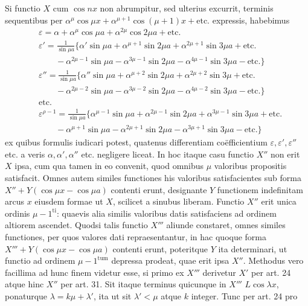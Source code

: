 Si functio $X$ cum $\cos nx$ non abrumpitur, sed ulterius excurrit, terminis
sequentibus per $\alpha^\mu\cos\mu x+\alpha^{\mu+1}\cos(\mu+1)x+\text{etc.}$ expressis, habebimus
\[
\begin{aligned}
&\varepsilon=\alpha+\alpha^\mu\cos\mu a+\alpha^{2\mu}\cos2\mu a+\text{etc.}\\[5pt]
&\varepsilon'=\frac{1}{\sin\mu a}\{\alpha'\sin\mu a+\alpha^{\mu+1}\sin2\mu a+\alpha^{2\mu+1}\sin3\mu a+\text{etc.}\\[5pt]
&\qquad-\alpha^{2\mu-1}\sin\mu a-\alpha^{3\mu-1}\sin2\mu a-\alpha^{4\mu-1}\sin3\mu a-\text{etc.}\}\\[5pt]
&\varepsilon''=\frac{1}{\sin\mu a}\{\alpha''\sin\mu a+\alpha^{\mu+2}\sin2\mu a+\alpha^{2\mu+2}\sin3\mu+\text{etc.}\\[5pt]
&\qquad-\alpha^{2\mu-2}\sin\mu a-\alpha^{3\mu-2}\sin2\mu a-\alpha^{4\mu-2}\sin3\mu a-\text{etc.}\}\\[5pt]
&\text{etc.}\\[5pt]
&\varepsilon^{\rho-1}=\frac{1}{\sin\mu a}\{\alpha^{\mu-1}\sin\mu a+\alpha^{2\mu-1}\sin2\mu a+\alpha^{3\mu-1}\sin3\mu a+\text{etc.}\\[5pt]
&\qquad-\alpha^{\mu+1}\sin\mu a-\alpha^{2\mu+1}\sin2\mu a-\alpha^{3\mu+1}\sin3\mu a-\text{etc.}\}
\end{aligned}
\]
ex quibus formulis iudicari potest, quatenus differentiam coëfficientium $\varepsilon,\varepsilon',\varepsilon''$ etc.
a veris $\alpha,\alpha',\alpha''$ etc. negligere liceat. In hoc itaque casu functio $X''$ non erit
$X$ ipsa, cum qua tamen in eo convenit, quod omnibus $\mu$ valoribus propositis satisfacit.
Omnes autem similes functiones his valoribus satisfacientes sub forma
$X''+Y(\cos\mu x-\cos\mu a)$ contenti erunt, designante $Y$ functionem indefinitam
arcus $x$ eiusdem formae ut $X$, scilicet a sinubus liberam. Functio $X''$ erit
unica ordinis $\mu-1^{\mathrm{ti}}$: quaevis alia similis valoribus datis satisfaciens ad ordinem
altiorem ascendet. Quodsi talis functio $X'''$ aliunde constaret, omnes
similes functiones, per quos valores dati repraesentantur, in hac quoque forma
$X'''+Y(\cos\mu x-\cos\mu a)$ contenti erunt, poteritque $Y$ ita determinari, ut functio
ad ordinem $\mu-1^{\mathrm{tum}}$ depressa prodeat, quae erit ipsa $X''$. Methodus vero facillima
ad hunc finem videtur esse, si primo ex $X'''$ derivetur $X'$ per art. 24 atque
hinc $X''$ per art. 31. Sit itaque terminus quicunque in $X'''$ $L\cos\lambda x$, ponaturque
$\lambda=k\mu+\lambda'$, ita ut sit $\lambda'<\mu$ atque $k$ integer. Tunc per art. 24 pro
